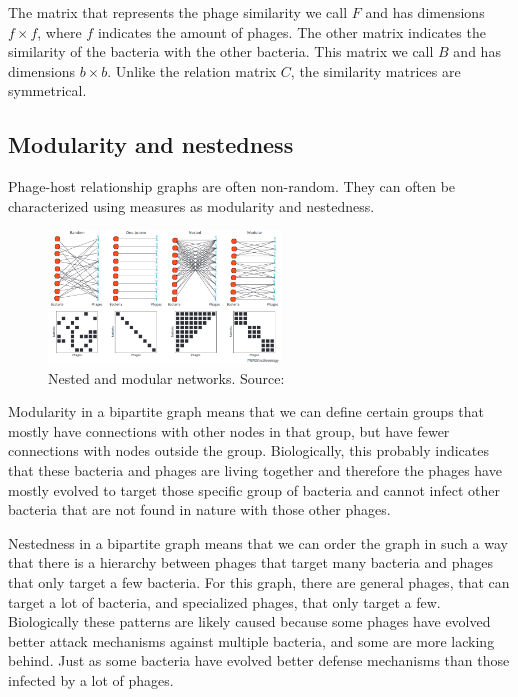 \documentclass{article}
\begin{document}
The matrix that represents the phage similarity we call $F$ and has dimensions $f \times f$,
where $f$ indicates the 
amount of phages. The other matrix indicates the similarity
of the bacteria with the other bacteria. This matrix we call $B$ and has
dimensions $b \times b$. Unlike the relation matrix $C$, the similarity matrices
are symmetrical. 

\subsection{Modularity and nestedness}

Phage-host relationship graphs are often non-random. They can often be
characterized using measures as modularity and nestedness.

\begin{figure}[hb]
\centering
\includegraphics[width=0.55\textwidth]{img/nested_and_modular.png}
\caption{Nested and modular networks. Source:~\cite{weitz2013phage}}
\end{figure}

Modularity in a bipartite graph means that we can define certain
groups that mostly have connections with other nodes in that group, but have fewer
connections with nodes outside the group. Biologically, this probably indicates
that these bacteria and phages are living together and therefore the phages
have mostly evolved to target those specific group of bacteria and cannot
infect other bacteria that are not found in nature with those other phages. 

Nestedness in a bipartite graph means that we can order the graph in such a 
way that there is a hierarchy between phages that target many bacteria 
and phages that only target a few bacteria. For this graph, there are 
general phages, that can target a lot of bacteria, and specialized phages, 
that only target a few. Biologically these patterns are likely caused because
some phages have evolved better attack mechanisms against multiple bacteria,
and some are more lacking behind. Just as some bacteria have evolved better
defense mechanisms than those infected by a lot of phages. 
\end{document}
